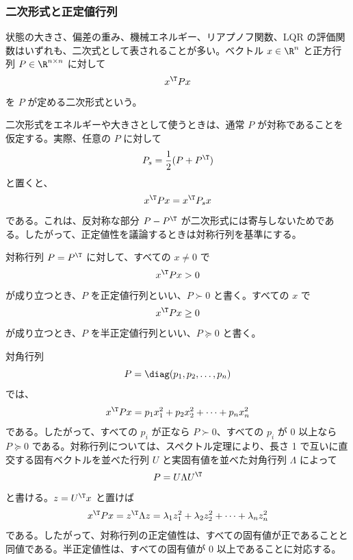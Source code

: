 \subsubsection{二次形式と正定値行列}

状態の大きさ、偏差の重み、機械エネルギー、リアプノフ関数、LQR の評価関数はいずれも、二次式として表されることが多い。ベクトル $x\in\R^n$ と正方行列 $P\in\R^{n\times n}$ に対して
\begin{equation}
  x^\T P x
\end{equation}
を $P$ が定める二次形式という。

二次形式をエネルギーや大きさとして使うときは、通常 $P$ が対称であることを仮定する。実際、任意の $P$ に対して
\begin{equation}
  P_s=\frac{1}{2}(P+P^\T)
\end{equation}
と置くと、
\begin{equation}
  x^\T P x=x^\T P_s x
\end{equation}
である。これは、反対称な部分 $P-P^\T$ が二次形式には寄与しないためである。したがって、正定値性を議論するときは対称行列を基準にする。

\begin{definition}[正定値行列と半正定値行列]
対称行列 $P=P^\T$ に対して、すべての $x\ne0$ で
\begin{equation}
  x^\T P x>0
\end{equation}
が成り立つとき、$P$ を正定値行列といい、$P\succ0$ と書く。すべての $x$ で
\begin{equation}
  x^\T P x\ge0
\end{equation}
が成り立つとき、$P$ を半正定値行列といい、$P\succeq0$ と書く。
\end{definition}

対角行列
\begin{equation}
  P=\diag(p_1,p_2,\ldots,p_n)
\end{equation}
では、
\begin{equation}
  x^\T P x=p_1x_1^2+p_2x_2^2+\cdots+p_nx_n^2
\end{equation}
である。したがって、すべての $p_i$ が正なら $P\succ0$、すべての $p_i$ が 0 以上なら $P\succeq0$ である。対称行列については、スペクトル定理により、長さ 1 で互いに直交する固有ベクトルを並べた行列 $U$ と実固有値を並べた対角行列 $\Lambda$ によって
\begin{equation}
  P=U\Lambda U^\T
\end{equation}
と書ける。$z=U^\T x$ と置けば
\begin{equation}
  x^\T P x
  =
  z^\T \Lambda z
  =
  \lambda_1z_1^2+\lambda_2z_2^2+\cdots+\lambda_nz_n^2
\end{equation}
である。したがって、対称行列の正定値性は、すべての固有値が正であることと同値である。半正定値性は、すべての固有値が 0 以上であることに対応する。

